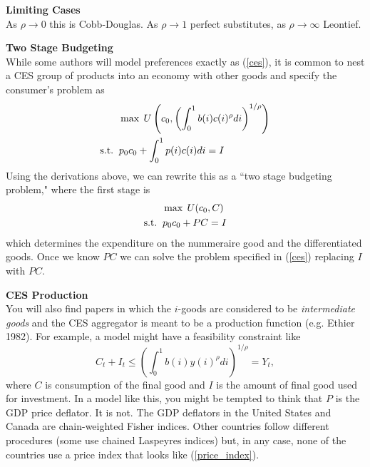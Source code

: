 \documentclass[11pt, pdftex]{article}
\begin{document}
\textbf{Limiting Cases}\\
As $\rho  \to 0$ this is Cobb-Douglas.  As $\rho \to 1$ perfect substitutes, as $\rho  \to \infty $ Leontief.

\textbf{Two Stage Budgeting}\\
While some authors will model preferences exactly as (\ref{ces}), it is common to nest a CES group of products into an economy with other goods and specify the consumer's problem as
\begin{align}
&\max \; U \left(c_0,\left(\int_0^1b(i)c(i)^\rho di \right)^{1/\rho}\right)\\
\text{s.t.}\;\;&p_0c_0+\int_0^1p(i)c(i) di =I \notag
\end{align}
Using the derivations above, we can rewrite this as a ``two stage budgeting problem," where the first stage is
\begin{align}
&\max \; U(c_0,C)\\
\text{s.t.}\;\;&p_0c_0+PC =I \notag
\end{align}
which determines the expenditure on the nummeraire good and the differentiated goods.  Once we know $PC$ we can solve the problem specified in (\ref{ces}) replacing $I$ with $PC$.

\textbf{CES Production}\\
You will also find papers in which the $i$-goods are considered to be \textit{intermediate goods} and the CES aggregator is meant to be a production function (e.g. Ethier 1982).  For example, a model might have a feasibility constraint like
\begin{equation}
C_t+I_t \leq \left(\int_0^1b(i)y(i)^\rho di \right)^{1/\rho}=Y_t,
\end{equation}
where $C$ is consumption of the final good and $I$ is the amount of final good used for investment.  In a model like this, you might be tempted to think that $P$ is the GDP price deflator.  It is not.  The GDP deflators in the United States and Canada are chain-weighted Fisher indices.  Other countries follow different procedures (some use chained Laspeyres indices) but, in any case, none of the countries use a price index that looks like (\ref{price_index}).
\end{document}
